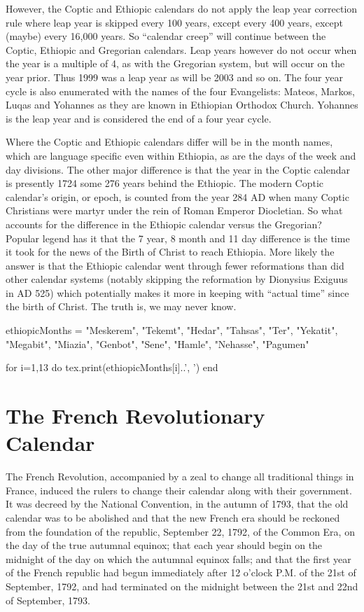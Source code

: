 However, the Coptic and Ethiopic calendars do not apply the leap year correction rule where leap year is skipped every 100 years, except every 400 years, except (maybe) every 16,000 years. So “calendar creep” will continue between the Coptic, Ethiopic and Gregorian calendars. Leap years however do not occur when the year is a multiple of 4, as with the Gregorian system, but will occur on the year prior. Thus 1999 was a leap year as will be 2003 and so on. The four year cycle is also enumerated with the names of the four Evangelists: Mateos, Markos, Luqas and Yohannes as they are known in Ethiopian Orthodox Church. Yohannes is the leap year and is considered the end of a four year cycle.

Where the Coptic and Ethiopic calendars differ will be in the month names, which are language specific even within Ethiopia, as are the days of the week and day divisions. The other major difference is that the year in the Coptic calendar is presently 1724 some 276 years behind the Ethiopic. The modern Coptic calendar’s origin, or epoch, is counted from the year 284 AD when many Coptic Christians were martyr under the rein of Roman Emperor Diocletian. So what accounts for the difference in the Ethiopic calendar versus the Gregorian? Popular legend has it that the 7 year, 8 month and 11 day difference is the time it took for the news of the Birth of Christ to reach Ethiopia. More likely the answer is that the Ethiopic calendar went through fewer reformations than did other calendar systems (notably skipping the reformation by Dionysius Exiguus in AD 525) which potentially makes it more in keeping with “actual time” since the birth of Christ. The truth is, we may never know.

\begin{luacode}
ethiopicMonths = {
"Meskerem",
"Tekemt",
"Hedar",
"Tahsas",
"Ter",
"Yekatit",
"Megabit",
"Miazia",
"Genbot",
"Sene",
"Hamle",
"Nehasse",
"Pagumen"
}

for i=1,13 do 
   tex.print(ethiopicMonths[i]..', ')
end
\end{luacode}


\section{The French Revolutionary Calendar}

The French Revolution, accompanied by a zeal to change all traditional things in France, induced the rulers to change their calendar along with their government.  It was decreed by the National Convention, in the autumn of 1793, that the old calendar was to be abolished and that the new French era should be reckoned from the foundation of the republic, September 22, 1792, of the Common Era, on the day of the true autumnal equinox; that each year should begin on the midnight of the day on which the autumnal equinox falls; and that the first year of the French republic had begun immediately after 12 o’clock P.M. of the 21st of September, 1792, and had terminated on the midnight between the 21st and 22nd of September, 1793.

